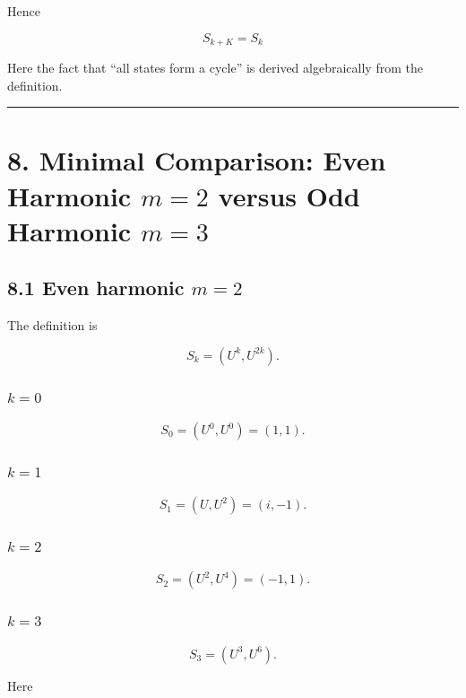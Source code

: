 \documentclass[
  a4paper,
]{article}
\begin{document}
Hence

\[
\boxed{
S_{k+K}=S_k
}
\]

Here the fact that ``all states form a cycle'' is derived algebraically
from the definition.

\begin{center}\rule{0.5\linewidth}{0.5pt}\end{center}

\section{\texorpdfstring{8. Minimal Comparison: Even Harmonic \(m=2\)
versus Odd Harmonic
\(m=3\)}{8. Minimal Comparison: Even Harmonic m=2 versus Odd Harmonic m=3}}\label{minimal-comparison-even-harmonic-m2-versus-odd-harmonic-m3}

\subsection{\texorpdfstring{8.1 Even harmonic
\(m=2\)}{8.1 Even harmonic m=2}}\label{even-harmonic-m2}

The definition is

\[
S_k
=
(U^k,U^{2k}).
\]

\subsubsection{\texorpdfstring{\(k=0\)}{k=0}}\label{k0}

\[
S_0
=
(U^0,U^0)
=
(1,1).
\]

\subsubsection{\texorpdfstring{\(k=1\)}{k=1}}\label{k1}

\[
S_1
=
(U,U^2)
=
(i,-1).
\]

\subsubsection{\texorpdfstring{\(k=2\)}{k=2}}\label{k2}

\[
S_2
=
(U^2,U^4)
=
(-1,1).
\]

\subsubsection{\texorpdfstring{\(k=3\)}{k=3}}\label{k3}

\[
S_3
=
(U^3,U^6).
\]

Here
\end{document}
